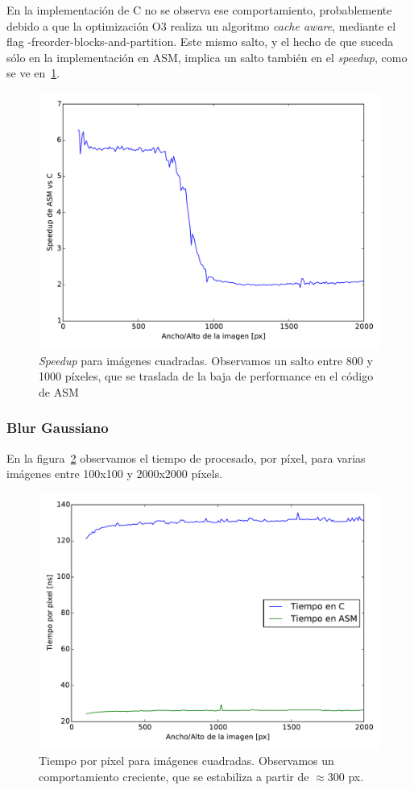 En la implementación de C no se observa ese comportamiento,
probablemente debido a que la optimización O3 realiza un algoritmo
\emph{cache aware}, mediante el flag {\ttfamily
  -freorder-blocks-and-partition}. Este mismo salto, y el hecho de que
suceda sólo en la implementación en ASM, implica un salto también en
el \emph{speedup}, como se ve en~\ref{fig:speedup_diff}.

\begin{figure}
  \centering
  \includegraphics[width=0.7\columnwidth]{speedup_diff.pdf}
  \caption{\emph{Speedup} para imágenes cuadradas. Observamos un
    salto entre 800 y 1000 píxeles, que se traslada de la baja de
    performance en el código de ASM}
  \label{fig:speedup_diff}
\end{figure}


\subsubsection{Blur Gaussiano}

En la figura~\ref{fig:tiempo_blur} observamos el tiempo de
procesado, por píxel, para varias imágenes entre 100x100 y 2000x2000
píxels. 

\begin{figure}
  \centering
  \includegraphics[width=0.7\columnwidth]{tiempo_blur.pdf}
  \caption{Tiempo por píxel para imágenes cuadradas. Observamos un
    comportamiento creciente, que se estabiliza a partir de
    $\approx 300$ px.}
  \label{fig:tiempo_blur}
\end{figure}

